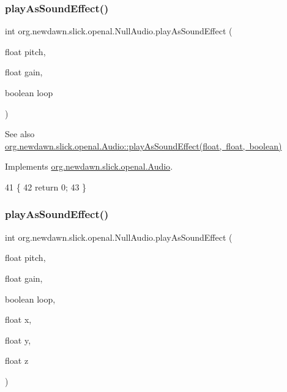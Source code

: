 \subsubsection{\texorpdfstring{play\+As\+Sound\+Effect()}{playAsSoundEffect()}\hspace{0.1cm}{\footnotesize\ttfamily [1/2]}}
{\footnotesize\ttfamily int org.\+newdawn.\+slick.\+openal.\+Null\+Audio.\+play\+As\+Sound\+Effect (\begin{DoxyParamCaption}\item[{float}]{pitch,  }\item[{float}]{gain,  }\item[{boolean}]{loop }\end{DoxyParamCaption})\hspace{0.3cm}{\ttfamily [inline]}}

\begin{DoxySeeAlso}{See also}
\mbox{\hyperlink{interfaceorg_1_1newdawn_1_1slick_1_1openal_1_1_audio_a69c3621a4a4bcbe9f1711f569c54017b}{org.\+newdawn.\+slick.\+openal.\+Audio\+::play\+As\+Sound\+Effect(float, float, boolean)}} 
\end{DoxySeeAlso}


Implements \mbox{\hyperlink{interfaceorg_1_1newdawn_1_1slick_1_1openal_1_1_audio_a69c3621a4a4bcbe9f1711f569c54017b}{org.\+newdawn.\+slick.\+openal.\+Audio}}.


\begin{DoxyCode}
41                                                                         \{
42         \textcolor{keywordflow}{return} 0;
43     \}
\end{DoxyCode}
\mbox{\label{classorg_1_1newdawn_1_1slick_1_1openal_1_1_null_audio_a087fe22212fb03b4345f5d08f1e27dd5}} 
\subsubsection{\texorpdfstring{play\+As\+Sound\+Effect()}{playAsSoundEffect()}\hspace{0.1cm}{\footnotesize\ttfamily [2/2]}}
{\footnotesize\ttfamily int org.\+newdawn.\+slick.\+openal.\+Null\+Audio.\+play\+As\+Sound\+Effect (\begin{DoxyParamCaption}\item[{float}]{pitch,  }\item[{float}]{gain,  }\item[{boolean}]{loop,  }\item[{float}]{x,  }\item[{float}]{y,  }\item[{float}]{z }\end{DoxyParamCaption})\hspace{0.3cm}{\ttfamily [inline]}}

